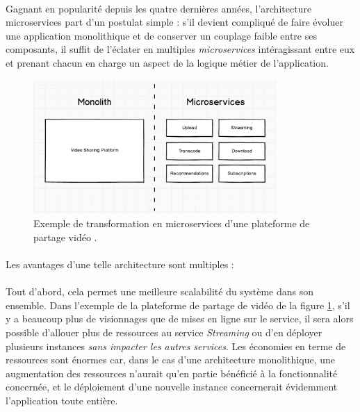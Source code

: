 \paragraph{} Gagnant en popularité depuis les quatre dernières années, l'architecture microservices part d'un postulat
simple : s'il devient compliqué de faire évoluer une application monolithique et de conserver un couplage faible entre ses
composants, il suffit de l'éclater en multiples \emph{microservices} intéragissant entre eux et prenant chacun en charge 
un aspect de la logique métier de l'application.

\begin{figure}[ht]
    \centering
    \includegraphics[width=350px]{chapters/02/images/monolith_to_microservices.png}
    \caption{\label{monolith_to_microservices}Exemple de transformation en microservices d'une plateforme de partage vidéo \cite{Microservices1}.}
\end{figure}

\paragraph{} Les avantages d'une telle architecture sont multiples :

\paragraph{} Tout d'abord, cela permet une meilleure scalabilité du système dans son ensemble. Dans l'exemple de la plateforme
de partage de vidéo de la figure \ref{monolith_to_microservices}, s'il y a beaucoup plus de visionnages que de mises en 
ligne sur le service, il sera alors possible d'allouer plus de ressources au service \emph{Streaming} ou d'en déployer
plusieurs instances \emph{sans impacter les autres services}. Les économies en terme de ressources sont énormes car, dans 
le cas d'une architecture monolithique, une augmentation des ressources n'aurait qu'en partie bénéficié à la fonctionnalité 
concernée, et le déploiement d'une nouvelle instance concernerait évidemment l'application toute entière.

